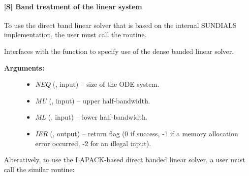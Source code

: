 \documentclass[letterpaper,10pt,english]{sphinxmanual}
\begin{document}
\paragraph{{[}\textbf{S}{]} Band treatment of the linear system}
\label{f_interface/Usage:s-band-treatment-of-the-linear-system}
To use the direct band linear solver that is based on the internal
SUNDIALS implementation, the user must call the {\hyperref[f_interface/Usage:f/_/FARKBAND]{}}
routine.

\begin{fulllineitems}
\label{f_interface/Usage:f/_/FARKBAND}
Interfaces with the {\hyperref[c_interface/User_callable:ARKBand]{}} function to
specify use of the dense banded linear solver.
\begin{description}
\item[{\textbf{Arguments:}}] \leavevmode\begin{itemize}
\item {} 
\emph{NEQ} (, input) -- size of the ODE system.

\item {} 
\emph{MU} (, input) -- upper half-bandwidth.

\item {} 
\emph{ML} (, input) -- lower half-bandwidth.

\item {} 
\emph{IER} (, output) -- return flag (0 if success, -1 if a memory allocation
error occurred, -2 for an illegal input).

\end{itemize}

\end{description}

\end{fulllineitems}


Alteratively, to use the LAPACK-based direct banded linear solver, a
user must call the similar {\hyperref[f_interface/Usage:f/_/FARKLAPACKBAND]{}} routine:
\end{document}
